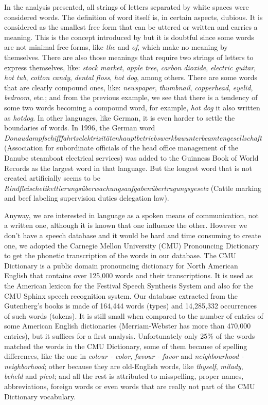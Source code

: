 In the analysis presented, all strings of letters separated by white spaces were considered words. The definition of word itself is, in certain aspects, dubious. It is considered as the smallest free form that can be uttered or written and carries a meaning. This is the concept introduced by \cite{bloomfield1926} but it is doubtful since some words are not minimal free forms, like \textit{the} and \textit{of}, which make no meaning by themselves. There are also those meanings that require two strings of letters to express themselves, like: \textit{stock market}, \textit{apple tree}, \textit{carbon dioxide}, \textit{electric guitar}, \textit{hot tub}, \textit{cotton candy}, \textit{dental floss}, \textit{hot dog}, among others. There are some words that are clearly compound ones, like: \textit{newspaper}, \textit{thumbnail}, \textit{copperhead}, \textit{eyelid}, \textit{bedroom}, etc.; and from the previous example, we see that there is a tendency of some two words becoming a compound word, for example, \textit{hot dog} it also written as \textit{hotdog}. In other languages, like German, it is even harder to settle the boundaries of words. In 1996, the German word \textit{Donaudampf\-schifffahrt\-selektrizitäten\-haupt\-betriebs\-werkbau\-unter\-beamten\-gesellschaft} (Association for subordinate officials of the head office management of the Danube steamboat electrical services) was added to the Guinness Book of World Records as the largest word in that language. But the longest word that is not created artificially seems to be \textit{Rindfleische\-tikettierungs\-über\-wachungs\-aufgaben\-über\-tragungs\-gesetz} (Cattle marking and beef labeling supervision duties delegation law).

Anyway, we are interested in language as a spoken means of communication, not a written one, 
although it is known that one influence the other. %
However we don't have a speech database and it would be hard and time consuming to create one, 
we adopted the Carnegie Mellon University (CMU) Pronouncing Dictionary to get the phonetic transcription 
of the words in our database. The CMU Dictionary is a public domain pronouncing dictionary for 
North American English that contains over 125,000 words and their transcriptions. 
It is used as the American lexicon for the Festival Speech Synthesis System and also for 
the CMU Sphinx speech recognition system. Our database extracted from the Gutenberg's books is 
made of 164,444 words (types) and 14,285,332 occurrences of such words (tokens). 
It is still small when compared to the number of entries of some American English dictionaries 
(Merriam-Webster has more than 470,000 entries), but it suffices for a first analysis. 
Unfortunately only 25\% of the words matched the words in the CMU Dictionary, 
some of them because of spelling differences, like the one in \textit{colour - color}, 
\textit{favour - favor} and \textit{neighbourhood - neighborhood}; 
other because they are old-English words, like \textit{thyself}, \textit{milady}, 
\textit{beheld} and \textit{picot}; and all the rest is attributed to misspelling, 
proper names, abbreviations, foreign words or even words that are really not part of 
the CMU Dictionary vocabulary.

